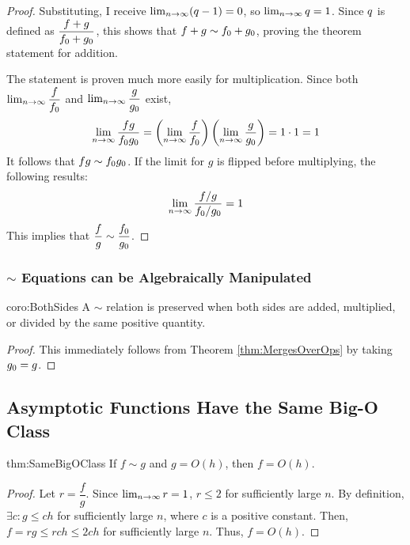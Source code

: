\begin{proof}
	Substituting, I receive $\lim_{n \to \infty} (q - 1) = 0$, so $\lim_{n \to \infty} q = 1$. Since $q$ is defined as $\dfrac{f + g}{f_0 + g_0}$, this shows that $f + g \sim f_0 + g_0$, proving the theorem statement for addition.
	
	The statement is proven much more easily for multiplication. Since both $\lim_{n \to \infty} \dfrac{f}{f_0}$ and $\lim_{n \to \infty} \dfrac{g}{g_0}$ exist,
	\begin{align*}
	\lim_{n \to \infty} \frac{fg}{f_0g_0} = \left( \lim_{n \to \infty} \frac{f}{f_0} \right) \left( \lim_{n \to \infty} \frac{g}{g_0} \right) = 1 \cdot 1 = 1
	\end{align*}
	It follows that $fg \sim f_0g_0$. If the limit for $g$ is flipped before multiplying, the following results:
	\begin{align*}
	\lim_{n \to \infty} \frac{f / g}{f_0 / g_0} = 1
	\end{align*}
	This implies that $\dfrac f g \sim \dfrac {f_0} {g_0}$.
\end{proof}

\subsubsection{$\sim$ Equations can be Algebraically Manipulated}

\begin{repcorollary}{coro:BothSides}
	A $\sim$ relation is preserved when both sides are added, multiplied, or divided by the same positive quantity.
\end{repcorollary}

\begin{proof}
	This immediately follows from Theorem \ref{thm:MergesOverOps} by taking $g_0 = g$.
\end{proof}

\subsection{Asymptotic Functions Have the Same Big-O Class}

\begin{reptheorem}{thm:SameBigOClass}
	If $f \sim g$ and $g = O(h)$, then $f = O(h)$.
\end{reptheorem}

\begin{proof}
	Let $r = \dfrac{f}{g}$. Since $\lim_{n \to \infty} r = 1$, $r \leq 2$ for sufficiently large $n$. By definition, $\exists c : g \leq c h$ for sufficiently large $n$, where $c$ is a positive constant. Then, $f = rg \leq rc h \leq 2c h$ for sufficiently large $n$. Thus, $f = O(h)$.
\end{proof}

